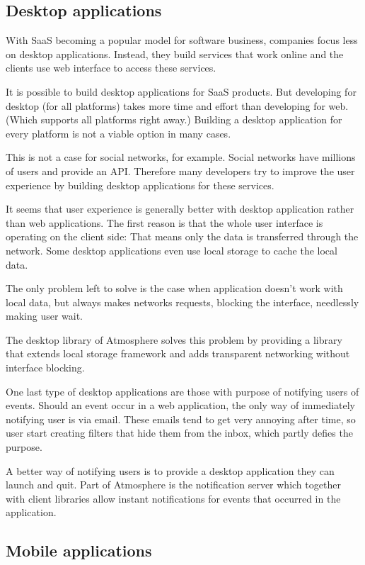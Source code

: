\subsection{Desktop applications}

With SaaS becoming a popular model for software business, companies focus less on desktop applications. Instead, they build services that work online and the clients use web interface to access these services.

It is possible to build desktop applications for SaaS products. But developing for desktop (for all platforms) takes more time and effort than developing for web. (Which supports all platforms right away.) Building a desktop application for every platform is not a viable option in many cases.

This is not a case for social networks, for example. Social networks have millions of users and provide an API. Therefore many developers try to improve the user experience by building desktop applications for these services.

It seems that user experience is generally better with desktop application rather than web applications. The first reason is that the whole user interface is operating on the client side: That means only the data is transferred through the network. Some desktop applications even use local storage to cache the local data.

The only problem left to solve is the case when application doesn't work with local data, but always makes networks requests, blocking the interface, needlessly making user wait.

The desktop library of Atmosphere solves this problem by providing a library that extends local storage framework and adds transparent networking without interface blocking. 

One last type of desktop applications are those with purpose of notifying users of events. Should an event occur in a web application, the only way of immediately notifying user is via email. These emails tend to get very annoying after time, so user start creating filters that hide them from the inbox, which partly defies the purpose.

A better way of notifying users is to provide a desktop application they can launch and quit. Part of Atmosphere is the notification server which together with client libraries allow instant notifications for events that occurred in the application. 

\subsection{Mobile applications}

